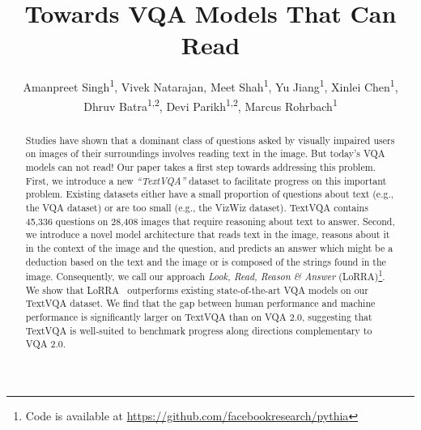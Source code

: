 \documentclass[10pt,twocolumn,letterpaper]{article}
\begin{document}
\title{Towards VQA Models That Can Read}
\author{Amanpreet Singh\textsuperscript{1}, Vivek Natarajan, Meet Shah\textsuperscript{1}, Yu Jiang\textsuperscript{1}, Xinlei Chen\textsuperscript{1},\\ Dhruv Batra\textsuperscript{1,2}, Devi Parikh\textsuperscript{1,2}, Marcus Rohrbach\textsuperscript{1}}

\newcommand{\datasetName}{TextVQA\xspace}
\newcommand{\datasetNQuestions}{45,336\xspace}
\newcommand{\datasetNImages}{28,408\xspace}
\newcommand{\sectionReduceTop}{-5mm}

\newcommand{\approachName}{\emph{Look, Read, Reason \& Answer} (LoRRA)\xspace}
\newcommand{\approachNameShort}{LoRRA\xspace}
\newcommand{\icon}[1]{\raisebox{-0.32\height}{\texttt{[image: \#1]}}}

\maketitle



\begin{abstract}
   Studies have shown that a dominant class of questions asked by visually impaired users on images of their surroundings involves reading text in the image. But today's VQA models can not read! Our paper takes a first step towards addressing this problem. First, we introduce a new \emph{``\datasetName''} dataset to facilitate progress on this important problem. Existing datasets either have a small proportion of questions about text (e.g., the VQA dataset) or are too small (e.g., the VizWiz dataset). \datasetName contains \datasetNQuestions{} questions on \datasetNImages{} images that require reasoning about text to answer.
   Second, we introduce a novel model architecture that reads text in the image, reasons about it in the context of the image and the question, and predicts an answer which might be a deduction based on the text and the image or is composed of the strings found in the image. Consequently, we call our approach \approachName\footnote{Code is available at \href{https://github.com/facebookresearch/pythia}{https://github.com/facebookresearch/pythia}}.
   We show that \approachNameShort~ outperforms existing state-of-the-art VQA models on our \datasetName dataset. 
   We find that the gap between human performance and machine performance is significantly larger on TextVQA than on VQA 2.0, suggesting that TextVQA is well-suited to benchmark progress along directions complementary to VQA 2.0. 
\end{abstract} 
\end{document}
